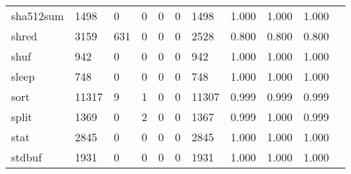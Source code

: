 \begin{longtable}{lp{1.10cm}p{1.10cm}p{1.10cm}p{1.10cm}p{1.10cm}p{1.10cm}p{1.10cm}p{1.10cm}p{1.10cm}p{1.10cm}}
sha512sum &                   1498 &                                  0 &                                 0 &                                0 &                                 0 &                            1498 &                          1.000 &                                 1.000 &                               1.000 \\
shred     &                   3159 &                                631 &                                 0 &                                0 &                                 0 &                            2528 &                          0.800 &                                 0.800 &                               0.800 \\
shuf      &                    942 &                                  0 &                                 0 &                                0 &                                 0 &                             942 &                          1.000 &                                 1.000 &                               1.000 \\
sleep     &                    748 &                                  0 &                                 0 &                                0 &                                 0 &                             748 &                          1.000 &                                 1.000 &                               1.000 \\
sort      &                  11317 &                                  9 &                                 1 &                                0 &                                 0 &                           11307 &                          0.999 &                                 0.999 &                               0.999 \\
split     &                   1369 &                                  0 &                                 2 &                                0 &                                 0 &                            1367 &                          0.999 &                                 1.000 &                               0.999 \\
stat      &                   2845 &                                  0 &                                 0 &                                0 &                                 0 &                            2845 &                          1.000 &                                 1.000 &                               1.000 \\
stdbuf    &                   1931 &                                  0 &                                 0 &                                0 &                                 0 &                            1931 &                          1.000 &                                 1.000 &                               1.000 \\

\end{longtable}
